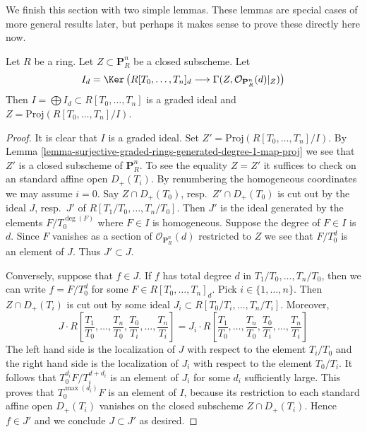 \noindent
We finish this section with two simple lemmas.
These lemmas are special cases of more general results later, but
perhaps it makes sense to prove these directly here now.

\begin{lemma}
\label{lemma-closed-in-projective-space}
Let $R$ be a ring. Let $Z \subset \mathbf{P}^n_R$ be a closed subscheme.
Let
$$
I_d = \Ker\left(
R[T_0, \ldots, T_n]_d
\longrightarrow
\Gamma(Z, \mathcal{O}_{\mathbf{P}^n_R}(d)|_Z)\right)
$$
Then $I = \bigoplus I_d \subset R[T_0, \ldots, T_n]$ is
a graded ideal and $Z = \text{Proj}(R[T_0, \ldots, T_n]/I)$.
\end{lemma}

\begin{proof}
It is clear that $I$ is a graded ideal.
Set $Z' = \text{Proj}(R[T_0, \ldots, T_n]/I)$.
By Lemma \ref{lemma-surjective-graded-rings-generated-degree-1-map-proj}
we see that $Z'$ is a closed subscheme of $\mathbf{P}^n_R$.
To see the equality $Z = Z'$
it suffices to check on an standard affine open
$D_{+}(T_i)$. By renumbering the homogeneous coordinates we
may assume $i = 0$. Say $Z \cap D_{+}(T_0)$, resp.\ $Z' \cap D_{+}(T_0)$
is cut out by the ideal $J$, resp.\ $J'$ of $R[T_1/T_0, \ldots, T_n/T_0]$.
Then $J'$ is the ideal generated by the elements $F/T_0^{\deg(F)}$ where
$F \in I$ is homogeneous.
Suppose the degree of $F \in I$ is $d$. Since $F$ vanishes as a section
of $\mathcal{O}_{\mathbf{P}^n_R}(d)$ restricted to $Z$ we see that
$F/T_0^d$ is an element of $J$. Thus $J' \subset J$.

\medskip\noindent
Conversely, suppose that $f \in J$. If $f$ has total degree
$d$ in $T_1/T_0, \ldots, T_n/T_0$, then we can write
$f = F/T_0^d$ for some $F \in R[T_0, \ldots, T_n]_d$.
Pick $i \in \{1, \ldots, n\}$. Then $Z \cap D_{+}(T_i)$ is
cut out by some ideal $J_i \subset R[T_0/T_i, \ldots, T_n/T_i]$.
Moreover,
$$
J \cdot
R\left[
\frac{T_1}{T_0}, \ldots, \frac{T_n}{T_0},
\frac{T_0}{T_i}, \ldots, \frac{T_n}{T_i}
\right]
=
J_i \cdot
R\left[
\frac{T_1}{T_0}, \ldots, \frac{T_n}{T_0},
\frac{T_0}{T_i}, \ldots, \frac{T_n}{T_i}
\right]
$$
The left hand side is the localization of $J$ with respect to the
element $T_i/T_0$ and the right hand side is the localization of $J_i$
with respect to the element $T_0/T_i$. It follows that
$T_0^{d_i}F/T_i^{d + d_i}$ is an element of $J_i$ for some $d_i$
sufficiently large. This proves that $T_0^{\max(d_i)}F$ is an
element of $I$, because its restriction to each standard affine
open $D_{+}(T_i)$ vanishes on the closed subscheme
$Z \cap D_{+}(T_i)$. Hence $f \in J'$ and we conclude $J \subset J'$
as desired.
\end{proof}

